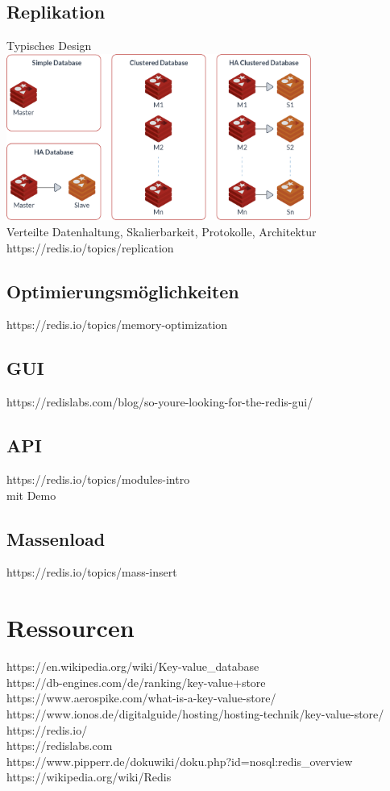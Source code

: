 \subsection{Replikation}
Typisches Design\\
\includegraphics[width=100mm]{media/diagram-cluster-architecture.png}\\[10mm]	
Verteilte Datenhaltung, Skalierbarkeit, Protokolle, Architektur
https://redis.io/topics/replication
\subsection{Optimierungsmöglichkeiten}
https://redis.io/topics/memory-optimization
\subsection{GUI}
https://redislabs.com/blog/so-youre-looking-for-the-redis-gui/
\subsection{API}
https://redis.io/topics/modules-intro\\
mit Demo
\subsection{Massenload}
https://redis.io/topics/mass-insert

\clearpage
\section{Ressourcen}
https://en.wikipedia.org/wiki/Key-value\_database\\
https://db-engines.com/de/ranking/key-value+store\\
https://www.aerospike.com/what-is-a-key-value-store/\\
https://www.ionos.de/digitalguide/hosting/hosting-technik/key-value-store/\\
https://redis.io/\\
https://redislabs.com\\
https://www.pipperr.de/dokuwiki/doku.php?id=nosql:redis\_overview\\
https://wikipedia.org/wiki/Redis\\